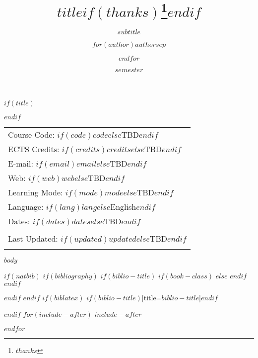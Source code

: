 \documentclass[$if(fontsize)$$fontsize$,$endif$$if(lang)$$babel-lang$,$endif$$if(papersize)$$papersize$,$endif$$for(classoption)$$classoption$$sep$,$endfor$]{article}
\title{$title$$if(thanks)$\thanks{$thanks$}$endif$}
\subtitle{$subtitle$}
\author{$for(author)$$author$$sep$ \and $endfor$}
\date{$semester$}
\begin{document}
  

	$if(title)$
	\maketitle
	$endif$
	
	
		\thispagestyle{firststyle}



	\noindent \begin{tabular*}{\textwidth}{ @{\extracolsep{\fill}} l @{\extracolsep{\fill}}}

Course Code: $if(code)$\href{https://uvt.osiris-student.nl/\#/onderwijscatalogus/extern/cursus?collegejaar=huidig\&taal=en\&cursuscode=$code$}{\tt $code$}$else$TBD$endif$  \\
ECTS Credits: $if(credits)$\texttt{$credits$}$else$TBD$endif$ \\ 
E-mail: $if(email)$\texttt{$email$}$else$TBD$endif$ \\ 
Web: $if(web)$\href{http://$web$}{\tt $web$}$else$TBD$endif$ \\
Learning Mode: $if(mode)$\texttt{$mode$}$else$TBD$endif$ \\
Language: $if(lang)$\texttt{$lang$}$else$English$endif$ \\
Dates: $if(dates)$\texttt{$dates$}$else$TBD$endif$  \\

\\
Last Updated: $if(updated)$$updated$$else$TBD$endif$ \\
\\
	\hline
	\end{tabular*}
	
\vspace{2mm}
	


$body$




$if(natbib)$
$if(bibliography)$
$if(biblio-title)$
$if(book-class)$
\renewcommand\bibname{$biblio-title$}
$else$
\renewcommand\refname{$biblio-title$}
$endif$
$endif$


$endif$
$endif$
$if(biblatex)$
\printbibliography$if(biblio-title)$[title=$biblio-title$]$endif$




$endif$
$for(include-after)$
$include-after$

$endfor$
\end{document}
